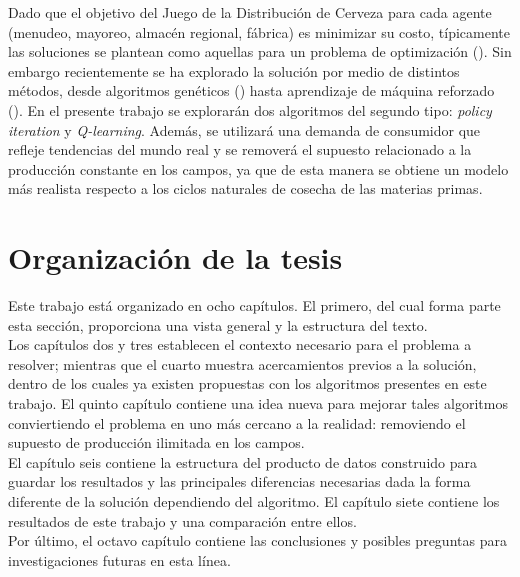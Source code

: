 Dado que el objetivo del Juego de la Distribuci\'on de Cerveza para cada agente (menudeo, mayoreo, almac\'en regional, f\'abrica) es minimizar su costo, t\'ipicamente las soluciones se plantean como aquellas para un problema de optimizaci\'on (\citet{Sterman}). Sin embargo recientemente se ha explorado la soluci\'on por medio de distintos m\'etodos, desde algoritmos gen\'eticos (\citet{Strozzi}) hasta aprendizaje de m\'aquina reforzado (\citet{Chaharsooghi}). En el presente trabajo se explorar\'an dos algoritmos del segundo tipo: \textit{policy iteration} y \textit{Q-learning}. Adem\'as, se utilizar\'a una demanda de consumidor que refleje tendencias del mundo real y se remover\'a el supuesto relacionado a la producci\'on constante en los campos, ya que de esta manera se obtiene un modelo m\'as realista respecto a los ciclos naturales de cosecha de las materias primas.

\section{Organizaci\'on de la tesis}

Este trabajo est\'a organizado en ocho cap\'itulos. El primero, del cual forma parte esta secci\'on, proporciona una vista general y la estructura del texto.\\

Los cap\'itulos dos y tres establecen el contexto necesario para el problema a resolver; mientras que el cuarto muestra acercamientos previos a la soluci\'on, dentro de los cuales ya existen propuestas con los algoritmos presentes en este trabajo. El quinto cap\'itulo contiene una idea nueva para mejorar tales algoritmos conviertiendo el problema en uno m\'as cercano a la realidad: removiendo el supuesto de producci\'on ilimitada en los campos.\\

El cap\'itulo seis contiene la estructura del producto de datos construido para guardar los resultados y las principales diferencias necesarias dada la forma diferente de la soluci\'on dependiendo del algoritmo. El cap\'itulo siete contiene los resultados de este trabajo y una comparaci\'on entre ellos.\\

Por \'ultimo, el octavo cap\'itulo contiene las conclusiones y posibles preguntas para investigaciones futuras en esta l\'inea.
